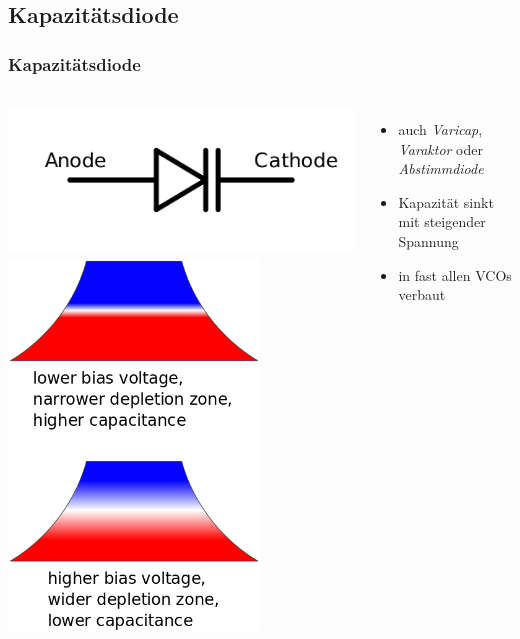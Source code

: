 \subsection*{Kapazitätsdiode}
\begin{frame}
  \frametitle{Kapazitätsdiode}
  \begin{columns}[c]
    \begin{center}
      \includegraphics[width=1\textwidth,height=.3\textheight,keepaspectratio]{a05/Varicap_symbol.png}\\
      \includegraphics[width=0.73\textwidth,height=.55\textheight,keepaspectratio]{a05/Varactor_function.png}
      \tiny \hyperlink{refs}{\cite{wm}}
    \end{center}
    \begin{itemize}
      \item auch \emph{Varicap}, \emph{Varaktor} oder \emph{Abstimmdiode}
      \item Kapazität sinkt mit steigender Spannung
      \item in fast allen VCOs verbaut
    \end{itemize}
  \end{columns}
\end{frame}


